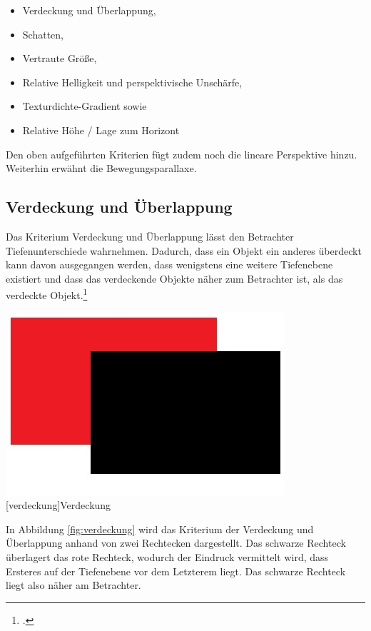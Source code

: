 \begin{itemize}
\item Verdeckung und Überlappung,
\item Schatten,
\item Vertraute Größe,
\item Relative Helligkeit und perspektivische Unschärfe,
\item Texturdichte-Gradient sowie
\item Relative Höhe / Lage zum Horizont
\end{itemize}

Den oben aufgeführten Kriterien fügt \cite{leyh10} zudem noch die lineare Perspektive hinzu. Weiterhin erwähnt \cite{Gras16} die Bewegungsparallaxe.

\subsection{Verdeckung und Überlappung}
Das Kriterium Verdeckung und Überlappung lässt den Betrachter Tiefenunterschiede wahrnehmen. Dadurch, dass ein Objekt ein anderes überdeckt kann davon ausgegangen werden, dass wenigstens eine weitere Tiefenebene existiert und dass das verdeckende Objekte näher zum Betrachter ist, als das verdeckte Objekt.\footcite[Vgl.]{heidXX}

\vspace{1em}
\begin{minipage}{\linewidth}
	\centering
	\includegraphics[width=0.7\linewidth]{images/verdeckung.jpg}
	[verdeckung]{Verdeckung}
	\label{fig:verdeckung}
\end{minipage}
\vspace{1em} 

In Abbildung \ref{fig:verdeckung} wird das Kriterium der Verdeckung und Überlappung anhand von zwei Rechtecken dargestellt. Das schwarze Rechteck überlagert das rote Rechteck, wodurch der Eindruck vermittelt wird, dass Ersteres auf der Tiefenebene vor dem Letzterem liegt. Das schwarze Rechteck liegt also näher am Betrachter.\\

